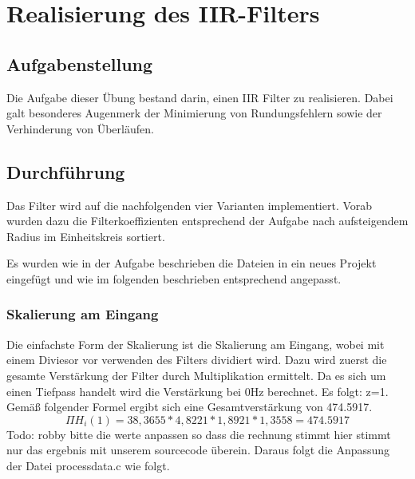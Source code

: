 \chapter{Realisierung des IIR-Filters}\label{Cha:RealIIR}
\section{Aufgabenstellung}
Die Aufgabe dieser Übung bestand darin, einen IIR Filter zu realisieren. Dabei galt besonderes Augenmerk der Minimierung von Rundungsfehlern sowie der Verhinderung von Überläufen.
\section{Durchf\"uhrung}
Das Filter wird auf die nachfolgenden vier Varianten implementiert. Vorab wurden dazu die Filterkoeffizienten entsprechend der Aufgabe nach aufsteigendem Radius im Einheitskreis sortiert.

Es wurden wie in der Aufgabe beschrieben die Dateien in ein neues Projekt eingefügt und wie im folgenden beschrieben entsprechend angepasst.
\subsection{Skalierung am Eingang}
Die einfachste Form der Skalierung ist die Skalierung am Eingang, wobei mit einem Diviesor vor verwenden des Filters dividiert wird. Dazu wird zuerst die gesamte Verstärkung der Filter durch Multiplikation ermittelt.
Da es sich um einen Tiefpass handelt wird die Verstärkung bei 0Hz berechnet. Es folgt: z=1.
Gemäß folgender Formel ergibt sich eine Gesamtverstärkung von 474.5917.
\begin{equation}
\Pi H_i(1)=38,3655*4,8221*1,8921*1,3558=474.5917
\end{equation}
Todo:  robby bitte die werte anpassen so dass die rechnung stimmt hier stimmt nur das ergebnis mit unserem sourcecode überein.
Daraus folgt die Anpassung der Datei process\textunderscore data.c wie folgt.\\

